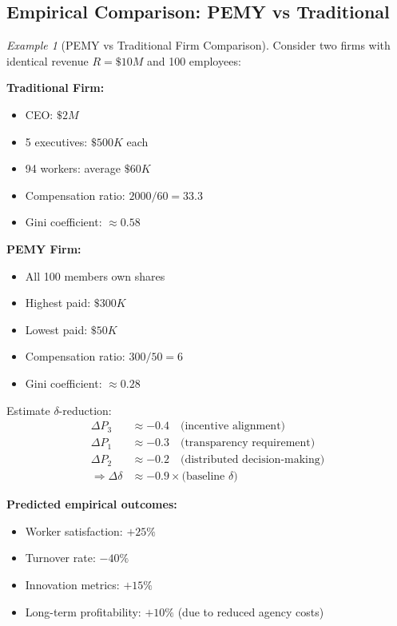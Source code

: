 \documentclass[11pt,a4paper]{article}
\theoremstyle{definition}
\theoremstyle{remark}
\newtheorem{example}{Example}[section]
\begin{document}
\subsection{Empirical Comparison: PEMY vs Traditional}
\label{app:pemy_comparison}

\begin{example}[PEMY vs Traditional Firm Comparison]
Consider two firms with identical revenue $R = \$10M$ and 100 employees:

\textbf{Traditional Firm:}
\begin{itemize}[leftmargin=1.5em]
    \item CEO: $\$2M$
    \item 5 executives: $\$500K$ each
    \item 94 workers: average $\$60K$
    \item Compensation ratio: $2000/60 = 33.3$
    \item Gini coefficient: $\approx 0.58$
\end{itemize}

\textbf{PEMY Firm:}
\begin{itemize}[leftmargin=1.5em]
    \item All 100 members own shares
    \item Highest paid: $\$300K$
    \item Lowest paid: $\$50K$
    \item Compensation ratio: $300/50 = 6$
    \item Gini coefficient: $\approx 0.28$
\end{itemize}

Estimate $\delta$-reduction:
\begin{align*}
\Delta P_3 &\approx -0.4 \quad \text{(incentive alignment)} \\
\Delta P_1 &\approx -0.3 \quad \text{(transparency requirement)} \\
\Delta P_2 &\approx -0.2 \quad \text{(distributed decision-making)} \\
\Rightarrow \Delta\delta &\approx -0.9 \times \text{(baseline $\delta$)}
\end{align*}

\textbf{Predicted empirical outcomes:}
\begin{itemize}[leftmargin=1.5em]
    \item Worker satisfaction: $+25\%$
    \item Turnover rate: $-40\%$
    \item Innovation metrics: $+15\%$
    \item Long-term profitability: $+10\%$ (due to reduced agency costs)
\end{itemize}
\end{example}
\end{document}
